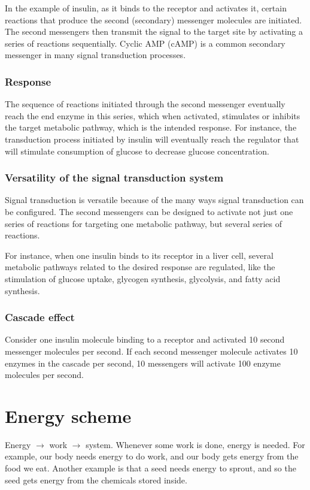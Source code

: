 \documentclass[11pt]{article}
\begin{document}
In the example of insulin, as it binds to the receptor and activates it, certain reactions that produce the second (secondary) messenger molecules are initiated. The second messengers then transmit the signal to the target site by activating a series of reactions sequentially. Cyclic AMP (cAMP) is a common secondary messenger in many signal transduction processes.
\subsubsection{Response}
\label{sec:orgc2325de}
The sequence of reactions initiated through the second messenger eventually reach the end enzyme in this series, which when activated, stimulates or inhibits the target metabolic pathway, which is the intended response. For instance, the transduction process initiated by insulin will eventually reach the regulator that will stimulate consumption of glucose to decrease glucose concentration.

\newpage
\subsubsection{Versatility of the signal transduction system}
\label{sec:org51d5260}
Signal transduction is versatile because of the many ways signal transduction can be configured. The second messengers can be designed to activate not just one series of reactions for targeting one metabolic pathway, but several series of reactions.


For instance, when one insulin binds to its receptor in a liver cell, several metabolic pathways related to the desired response are regulated, like the stimulation of glucose uptake, glycogen synthesis, glycolysis, and fatty acid synthesis.
\subsubsection{Cascade effect}
\label{sec:org1cc9391}
Consider one insulin molecule binding to a receptor and activated 10 second messenger molecules per second. If each second messenger molecule activates 10 enzymes in the cascade per second, 10 messengers will activate 100 enzyme molecules per second.
\section{Energy scheme}
\label{sec:org54f0f10}
Energy \(\rightarrow\) work \(\rightarrow\) system. Whenever some work is done, energy is needed. For example, our body needs energy to do work, and our body gets energy from the food we eat. Another example is that a seed needs energy to sprout, and so the seed gets energy from the chemicals stored inside.
\end{document}
